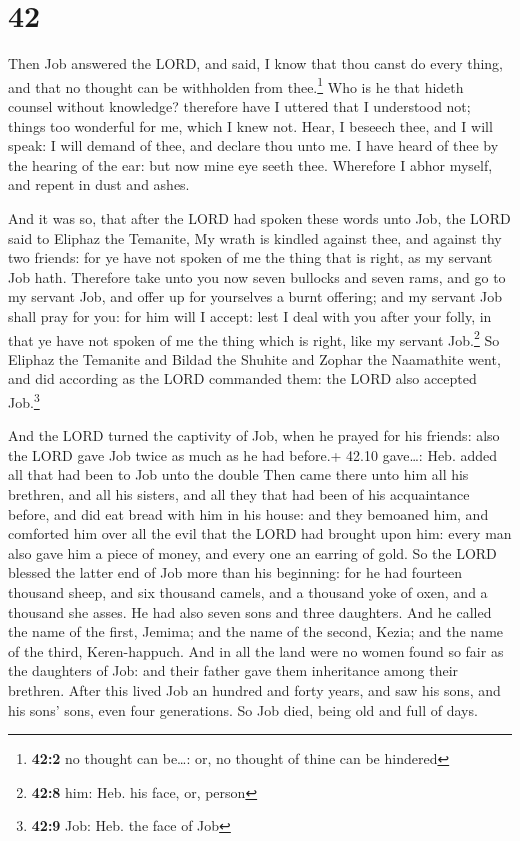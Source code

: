 \hypertarget{section-41}{%
\section{42}\label{section-41}}

 Then Job answered the LORD, and said,  I
know that thou canst do every thing, and that no thought can be
withholden from thee.\footnote{\textbf{42:2} no thought can be\ldots:
  or, no thought of thine can be hindered}  Who is he that
hideth counsel without knowledge? therefore have I uttered that I
understood not; things too wonderful for me, which I knew not.
 Hear, I beseech thee, and I will speak: I will demand of
thee, and declare thou unto me.  I have heard of thee by
the hearing of the ear: but now mine eye seeth thee. 
Wherefore I abhor myself, and repent in dust and ashes.

 And it was so, that after the LORD had spoken these words
unto Job, the LORD said to Eliphaz the Temanite, My wrath is kindled
against thee, and against thy two friends: for ye have not spoken of me
the thing that is right, as my servant Job hath. 
Therefore take unto you now seven bullocks and seven rams, and go to my
servant Job, and offer up for yourselves a burnt offering; and my
servant Job shall pray for you: for him will I accept: lest I deal with
you after your folly, in that ye have not spoken of me the thing which
is right, like my servant Job.\footnote{\textbf{42:8} him: Heb. his
  face, or, person}  So Eliphaz the Temanite and Bildad
the Shuhite and Zophar the Naamathite went, and did according as the
LORD commanded them: the LORD also accepted Job.\footnote{\textbf{42:9}
  Job: Heb. the face of Job}

 And the LORD turned the captivity of Job, when he prayed
for his friends: also the LORD gave Job twice as much as he had before.+
42.10 gave\ldots: Heb. added all that had been to Job unto the double
 Then came there unto him all his brethren, and all his
sisters, and all they that had been of his acquaintance before, and did
eat bread with him in his house: and they bemoaned him, and comforted
him over all the evil that the LORD had brought upon him: every man also
gave him a piece of money, and every one an earring of gold.
 So the LORD blessed the latter end of Job more than his
beginning: for he had fourteen thousand sheep, and six thousand camels,
and a thousand yoke of oxen, and a thousand she asses. 
He had also seven sons and three daughters.  And he
called the name of the first, Jemima; and the name of the second, Kezia;
and the name of the third, Keren-happuch.  And in all the
land were no women found so fair as the daughters of Job: and their
father gave them inheritance among their brethren.  After
this lived Job an hundred and forty years, and saw his sons, and his
sons' sons, even four generations.  So Job died, being
old and full of days.
